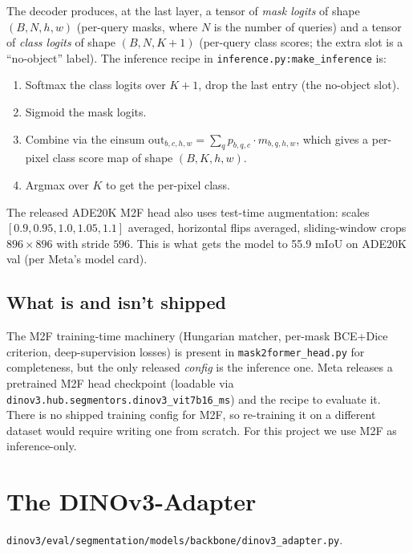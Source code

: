 \documentclass[11pt,a4paper]{article}
\begin{document}
The decoder produces, at the last layer, a tensor of \emph{mask logits}
of shape $(B, N, h, w)$ (per-query masks, where $N$ is the number of
queries) and a tensor of \emph{class logits} of shape $(B, N, K{+}1)$
(per-query class scores; the extra slot is a ``no-object'' label). The
inference recipe in \texttt{inference.py:make\_inference} is:
\begin{enumerate}[leftmargin=1.6em,itemsep=0pt]
  \item Softmax the class logits over $K{+}1$, drop the last entry (the
        no-object slot).
  \item Sigmoid the mask logits.
  \item Combine via the einsum
        $\text{out}_{b,c,h,w} = \sum_q p_{b,q,c} \cdot m_{b,q,h,w}$,
        which gives a per-pixel class score map of shape $(B,K,h,w)$.
  \item Argmax over $K$ to get the per-pixel class.
\end{enumerate}
The released ADE20K M2F head also uses test-time augmentation: scales
$[0.9, 0.95, 1.0, 1.05, 1.1]$ averaged, horizontal flips averaged,
sliding-window crops $896{\times}896$ with stride $596$. This is what
gets the model to 55.9 mIoU on ADE20K val (per Meta's model card).

\subsection{What is and isn't shipped}

The M2F training-time machinery (Hungarian matcher, per-mask BCE+Dice
criterion, deep-supervision losses) is present in
\texttt{mask2former\_head.py} for completeness, but the only released
\emph{config} is the inference one. Meta releases a pretrained M2F head
checkpoint (loadable via \texttt{dinov3.hub.segmentors.dinov3\_vit7b16\_ms})
and the recipe to evaluate it. There is no shipped training config for
M2F, so re-training it on a different dataset would require writing one
from scratch. For this project we use M2F as inference-only.

\section{The DINOv3-Adapter}
\label{sec:adapter}

\begin{srcbox}
\texttt{dinov3/eval/segmentation/models/backbone/dinov3\_adapter.py}.
\end{srcbox}
\end{document}
